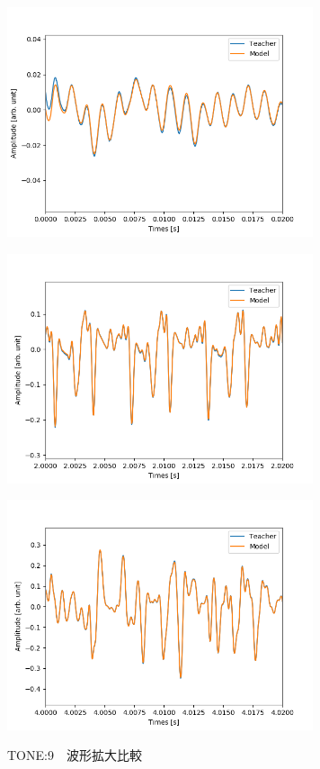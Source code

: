 \documentclass{jreport}		%
\begin{document}
\begin{figure}[htbp]
\begin{minipage}{0.5\hsize}
\begin{center}
 \end{center}
 \label{fig:one}
 \end{minipage}
 \begin{minipage}{0.5\hsize}
 \begin{center}
  \includegraphics[width=90mm]{tone1_output_hikaku4.png}
 \end{center}
 \label{fig:two}
 \end{minipage}
 \begin{minipage}{0.5\hsize}
 \begin{center}
  \includegraphics[width=90mm]{tone1_output_hikaku5.png}
 \end{center}
 \label{fig:one}
 \end{minipage}
 \begin{minipage}{0.5\hsize}
 \begin{center}
  \includegraphics[width=90mm]{tone1_output_hikaku6.png}
 \end{center}
 \label{fig:two}
 \end{minipage}
 \caption{TONE:9　波形拡大比較}
\end{figure}
\end{document}
